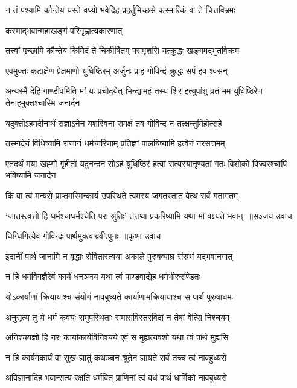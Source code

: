 \twolineshloka
{न तं पश्यामि कौन्तेय यस्ते वध्यो भवेदिह}
{प्रहर्तुमिच्छसे कस्मात्किं वा ते चित्तविभ्रमः}


\twolineshloka
{कस्माद्भवान्महाखङ्गं परिगृह्णात्यकारणात्}
{}


\twolineshloka
{तत्त्वां पृच्छामि कौन्तेय किमिदं ते चिकीर्षितम्}
{परामृशसि यत्क्रुद्धः खङ्गमद्भुतविक्रम}


\twolineshloka
{एवमुक्तः कटाक्षेण प्रेक्षमाणो युधिष्ठिरम्}
{अर्जुनः प्राह गोविन्दं क्रुद्धः सर्प इव श्वसन्}


\threelineshloka
{अन्यस्मै देहि गाण्डीवमिति मां यः प्रचोदयेत्}
{भिन्द्यामहं तस्य शिर इत्युपांशु व्रतं मम}
{युधिष्ठिरेण तेनाहमुक्तश्चास्मि जनार्दन}


\twolineshloka
{यदुक्तोऽहमदीनार्थं राज्ञाऽनेन यशस्विना}
{समक्षं तव गोविन्द न तत्क्षन्तुमिहोत्सहे}


\twolineshloka
{तस्मादेनं विधिष्यामि राजानं धर्मचारिणाम्}
{प्रतिज्ञां पालयिष्यामि हत्वैनं नरसत्तमम्}


\threelineshloka
{एतदर्थं मया खह्गो गृहीतो यदुनन्दन}
{सोऽहं युधिष्ठिरं हत्वा सत्यस्यानृण्यतां गतः}
{विशोको विज्वरश्चापि भविष्यामि जनार्दन}


\twolineshloka
{किं वा त्वं मन्यसे प्राप्तमस्मिन्कार्य उपस्थिते}
{त्वमस्य जगतस्तात वेत्थ सर्वं गतागतम्}


\threelineshloka
{`जातस्त्वत्तो हि धर्मश्चाधर्मश्चेति परा श्रुतिः'}
{तत्तथा प्रकरिष्यामि यथा मां वक्ष्यते भवान् ॥सञ्जय उवाच}
{}


\twolineshloka
{धिग्धिगित्येव गोविन्दः पार्थमुक्त्वाब्रवीत्पुनः ॥कृष्ण उवाच}
{}


\twolineshloka
{इदानीं पार्थ जानामि न वृद्धाः सेवितास्त्वया}
{अकाले पुरुषव्याघ्र संरम्भं यद्भवानगात्}


\twolineshloka
{न हि धर्मविगज्ञैरेवं कार्यं धनञ्जय}
{यथा त्वं पाण्डवाद्येह धर्मभीरुरण्डितः}


\twolineshloka
{योऽकार्याणां क्रियायाश्च संयोगं नावबुध्यते}
{कार्याणामक्रियायाश्च स पार्थ पुरुषाधमः}


\twolineshloka
{अनुसृत्य तु ये धर्मं कवयः समुपस्थिताः}
{समासविस्तरविदां न तेषां वेत्सि निश्चयम्}


\twolineshloka
{अनिश्चयज्ञो हि नरः कार्याकार्यविनिश्चये}
{एवं स मुह्यत्यवशो यथा त्वं पार्थ मुह्यसि}


\twolineshloka
{न हि कार्यमकार्यं वा सुखं ज्ञातुं कथञ्चन}
{श्रुतेन ज्ञायते सर्वं तच्च त्वं नावहुध्यसे}


\twolineshloka
{अविज्ञानादिह भवान्सत्यं रक्षति धर्मवित्}
{प्राणिनां त्वं वधं पार्थ धार्मिको नावबुध्यसे}


